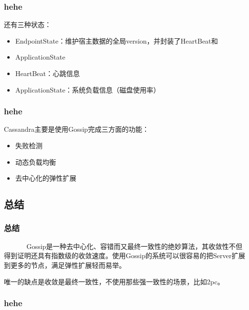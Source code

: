 \documentclass[slidestop,compress,mathserif,c]{beamer}
\begin{document}
\begin{frame}
\frametitle{hehe}
 还有三种状态：
 \begin{itemize}
\item EndpointState：维护宿主数据的全局version，并封装了HeartBeat和\item ApplicationState
\item HeartBeat：心跳信息
\item ApplicationState：系统负载信息（磁盘使用率）
 \end{itemize}
\end{frame}

\begin{frame}
\frametitle{hehe}
 Cassandra主要是使用Gossip完成三方面的功能：
\begin{itemize}
\item 失败检测
\item 动态负载均衡
\item 去中心化的弹性扩展
\end{itemize}
\end{frame}

\subsection{\hfill 总结}
\begin{frame}
\frametitle{总结}
~~~~~~ Gossip是一种去中心化、容错而又最终一致性的绝妙算法，其收敛性不但得到证明还具有指数级的收敛速度。使用Gossip的系统可以很容易的把Server扩展到更多的节点，满足弹性扩展轻而易举。
 
唯一的缺点是收敛是最终一致性，不使用那些强一致性的场景，比如2pc。
\end{frame}

\begin{frame}
\frametitle{hehe}
 
\end{frame}
\end{document}

